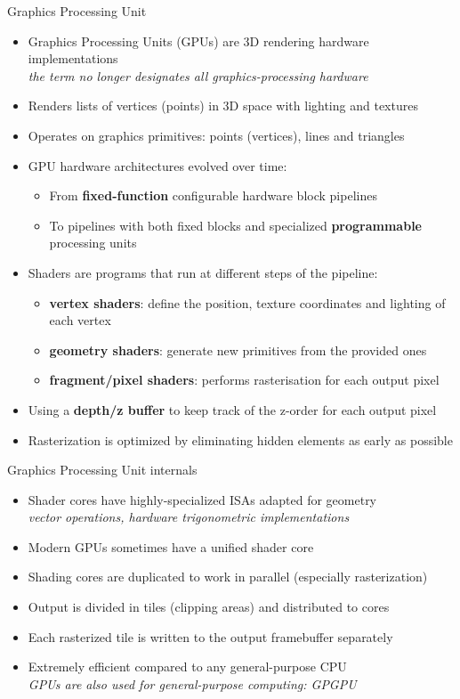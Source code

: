 \begin{frame}{Graphics Processing Unit}
  \begin{itemize}
  \item Graphics Processing Units (GPUs) are 3D rendering hardware implementations\\
    \textit{the term no longer designates all graphics-processing hardware}
  \item Renders lists of vertices (points) in 3D space with lighting and textures
  \item Operates on graphics primitives: points (vertices), lines and triangles
  \item GPU hardware architectures evolved over time:
    \begin{itemize}
    \item From \textbf{fixed-function} configurable hardware block pipelines
    \item To pipelines with both fixed blocks and specialized \textbf{programmable} processing units
    \end{itemize}
  \item Shaders are programs that run at different steps of the pipeline:
    \begin{itemize}
    \item \textbf{vertex shaders}: define the position, texture coordinates and lighting of each vertex
    \item \textbf{geometry shaders}: generate new primitives from the provided ones
    \item \textbf{fragment/pixel shaders}: performs rasterisation for each output pixel
    \end{itemize}
  \item Using a \textbf{depth/z buffer} to keep track of the z-order for each output pixel
  \item Rasterization is optimized by eliminating hidden elements as early as possible
  \end{itemize}
\end{frame}

\begin{frame}{Graphics Processing Unit internals}
  \begin{itemize}
  \item Shader cores have highly-specialized ISAs adapted for geometry\\
    \textit{vector operations, hardware trigonometric implementations}
  \item Modern GPUs sometimes have a unified shader core
  \item Shading cores are duplicated to work in parallel (especially rasterization)
  \item Output is divided in tiles (clipping areas) and distributed to cores
  \item Each rasterized tile is written to the output framebuffer separately
  \item Extremely efficient compared to any general-purpose CPU\\
    \textit{GPUs are also used for general-purpose computing: GPGPU}
  \end{itemize}
\end{frame}

